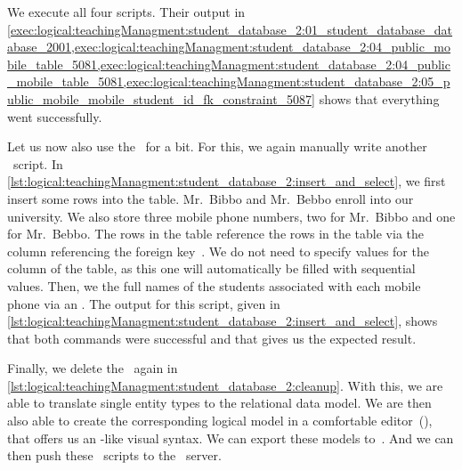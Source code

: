 We execute all four scripts.
Their output in \cref{exec:logical:teachingManagment:student_database_2:01_student_database_database_2001,exec:logical:teachingManagment:student_database_2:04_public_mobile_table_5081,exec:logical:teachingManagment:student_database_2:04_public_mobile_table_5081,exec:logical:teachingManagment:student_database_2:05_public_mobile_mobile_student_id_fk_constraint_5087} shows that everything went successfully.

Let us now also use the \db\ for a bit.
For this, we again manually write another \sql~script.
In \cref{lst:logical:teachingManagment:student_database_2:insert_and_select}, we first insert some rows into the  table.
Mr.~Bibbo and Mr.~Bebbo enroll into our university.
We also store three mobile phone numbers, two for Mr.~Bibbo and one for Mr.~Bebbo.
The rows in the  table reference the rows in the  table via the  column referencing the foreign key~.
We do not need to specify values for the  column of the  table, as this one will automatically be filled with sequential values.
Then, we  the full names of the students associated with each mobile phone via an .
The output for this script, given in \cref{lst:logical:teachingManagment:student_database_2:insert_and_select}, shows that both  commands were successful and that  gives us the expected result.

Finally, we delete the \db\ again in \cref{lst:logical:teachingManagment:student_database_2:cleanup}.
With this, we are able to translate single entity types to the relational data model.
We are then also able to create the corresponding logical model in a comfortable editor~(\pgmodeler), that offers us an -like visual syntax.
We can export these models to~\sql.
And we can then push these \sql~scripts to the \postgresql\ server.
\FloatBarrier%
\endhsection%
%
